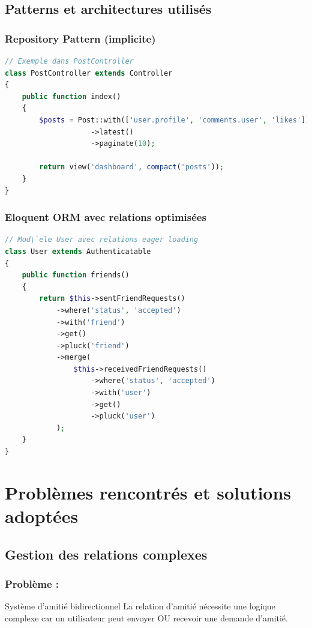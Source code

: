 \documentclass[12pt,a4paper]{article}
\begin{document}
\subsection{Patterns et architectures utilis\'es}

\subsubsection{Repository Pattern (implicite)}
\begin{lstlisting}[language=PHP]
// Exemple dans PostController
class PostController extends Controller
{
    public function index()
    {
        $posts = Post::with(['user.profile', 'comments.user', 'likes'])
                    ->latest()
                    ->paginate(10);
                    
        return view('dashboard', compact('posts'));
    }
}
\end{lstlisting}

\subsubsection{Eloquent ORM avec relations optimis\'ees}
\begin{lstlisting}[language=PHP]
// Mod\`ele User avec relations eager loading
class User extends Authenticatable
{
    public function friends()
    {
        return $this->sentFriendRequests()
            ->where('status', 'accepted')
            ->with('friend')
            ->get()
            ->pluck('friend')
            ->merge(
                $this->receivedFriendRequests()
                    ->where('status', 'accepted')
                    ->with('user')
                    ->get()
                    ->pluck('user')
            );
    }
}
\end{lstlisting}

\section{Probl\`emes rencontr\'es et solutions adopt\'ees}

\subsection{Gestion des relations complexes}

\subsubsection{Probl\`eme :} Syst\`eme d'amiti\'e bidirectionnel
La relation d'amiti\'e n\'ecessite une logique complexe car un utilisateur peut envoyer OU recevoir une demande d'amiti\'e.
\end{document}
